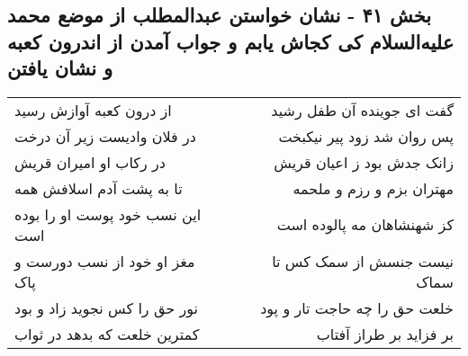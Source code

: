 \begin{center}
\section*{بخش ۴۱ - نشان خواستن عبدالمطلب از موضع محمد علیه‌السلام کی کجاش یابم و جواب آمدن از اندرون کعبه و نشان یافتن}
\label{sec:sh041}
\begin{longtable}{l p{0.5cm} r}
از درون کعبه آوازش رسید
&&
گفت ای جوینده آن طفل رشید
\\
در فلان وادیست زیر آن درخت
&&
پس روان شد زود پیر نیکبخت
\\
در رکاب او امیران قریش
&&
زانک جدش بود ز اعیان قریش
\\
تا به پشت آدم اسلافش همه
&&
مهتران بزم و رزم و ملحمه
\\
این نسب خود پوست او را بوده است
&&
کز شهنشاهان مه پالوده است
\\
مغز او خود از نسب دورست و پاک
&&
نیست جنسش از سمک کس تا سماک
\\
نور حق را کس نجوید زاد و بود
&&
خلعت حق را چه حاجت تار و پود
\\
کمترین خلعت که بدهد در ثواب
&&
بر فزاید بر طراز آفتاب
\\
\end{longtable}
\end{center}
